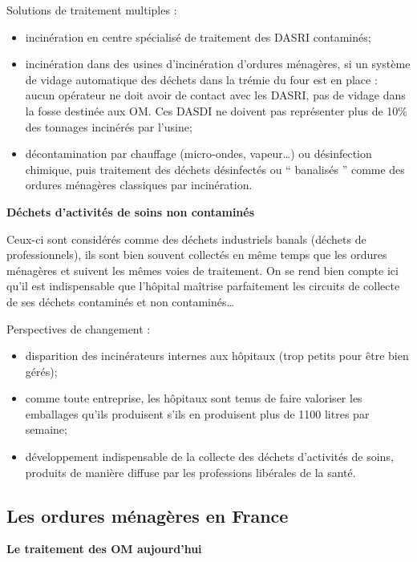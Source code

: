 Solutions de traitement multiples :
\begin{itemize}

\item incinération en centre spécialisé de traitement des DASRI contaminés;
\item incinération dans des usines d’incinération d’ordures ménagères, si un système de vidage automatique des déchets dans la trémie du four est en place : aucun opérateur ne doit avoir de contact avec les DASRI, pas de vidage dans la fosse destinée aux OM. Ces DASDI ne doivent pas représenter plus de 10\% des tonnages incinérés par l’usine;
\item décontamination par chauffage (micro-ondes, vapeur…) ou désinfection chimique, puis traitement des déchets désinfectés ou “ banalisés ” comme des ordures ménagères classiques par incinération.
\end{itemize}

\vspace{0.3cm} 
\textbf{Déchets d’activités de soins non contaminés}
\vspace{0.3cm}

Ceux-ci sont considérés comme des déchets industriels banals (déchets de professionnels), ils sont bien souvent collectés en même temps que les ordures ménagères et suivent les mêmes voies de traitement.
On se rend bien compte ici qu’il est indispensable que l’hôpital maîtrise parfaitement les circuits de collecte de ses déchets contaminés et non contaminés…


Perspectives de changement :
\begin{itemize}
\item disparition des incinérateurs internes aux hôpitaux (trop petits pour être bien gérés);
\item comme toute entreprise, les hôpitaux sont tenus de faire valoriser les emballages qu’ils produisent s’ils en produisent plus de 1100 litres par semaine;
\item développement indispensable de la collecte des déchets d’activités de soins, produits de manière diffuse par les professions libérales de la santé.
\end{itemize}

\subsection{Les ordures ménagères en France}

\textbf{Le traitement des OM aujourd’hui}
\vspace{0.3cm}

